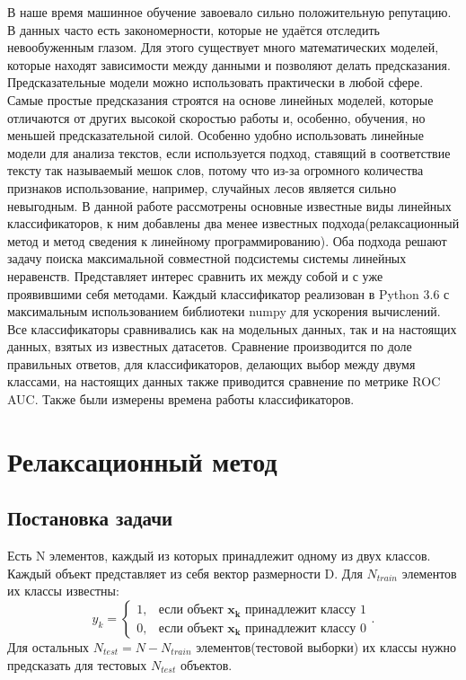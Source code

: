 \documentclass[a4paper]{article}
\newcommand{\yk}{y_k}
\newcommand{\xk}{\bm{x_k}}
\begin{document}
В наше время машинное обучение завоевало сильно положительную репутацию. В данных часто есть закономерности, которые не удаётся отследить невообуженным глазом. Для этого существует много математических моделей, которые находят зависимости между данными и позволяют делать предсказания. Предсказательные модели можно использовать практически в любой сфере. Самые простые предсказания строятся на основе линейных моделей, которые отличаются от других высокой скоростью работы и, особенно, обучения, но меньшей предсказательной силой. Особенно удобно использовать линейные модели для анализа текстов, если используется подход, ставящий в соответствие тексту так называемый мешок слов, потому что из-за огромного количества признаков использование, например, случайных лесов является сильно невыгодным. В данной работе рассмотрены основные известные виды линейных классификаторов, к ним добавлены два менее известных подхода(релаксационный метод и метод сведения к линейному программированию). Оба подхода решают задачу поиска максимальной совместной подсистемы системы линейных неравенств. Представляет интерес сравнить их между собой и с уже проявившими себя методами. Каждый классификатор реализован в Python 3.6 с максимальным использованием библиотеки numpy для ускорения вычислений. Все классификаторы сравнивались как на модельных данных, так и на настоящих данных, взятых из известных датасетов. Сравнение производится по доле правильных ответов, для классификаторов, делающих выбор между двумя классами, на настоящих данных также приводится сравнение по метрике ROC AUC. Также были измерены времена работы классификаторов.

\section{Релаксационный метод}
\subsection{Постановка задачи}

Есть N элементов, каждый из которых принадлежит одному из двух классов. Каждый объект представляет из себя вектор размерности D.  Для $N_{train}$ элементов их классы известны: 
$$\yk = \begin{cases}
1, & \text{если объект } \xk \text{ принадлежит классу 1}\\
0, & \text{если объект } \xk \text{ принадлежит классу 0}
\end{cases}.
$$Для остальных $N_{test} = N - N_{train}$ элементов(тестовой выборки) их классы нужно предсказать для тестовых $N_{test}$ объектов.
\end{document}
